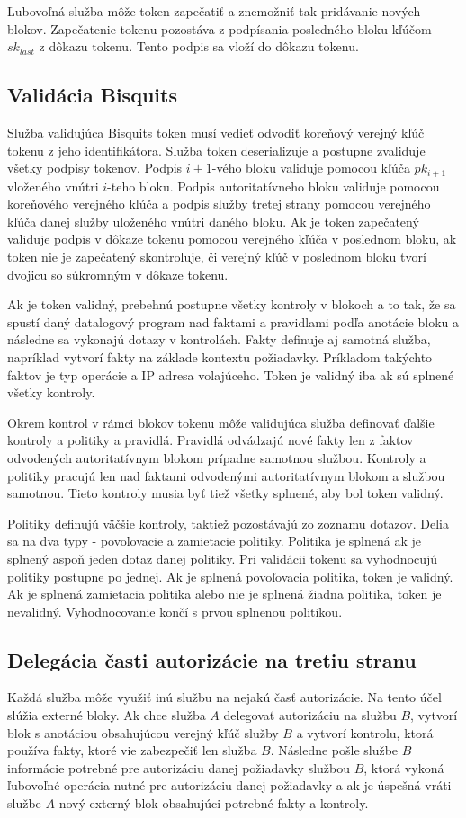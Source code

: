 Ľubovoľná služba môže token zapečatiť a znemožniť tak pridávanie nových blokov. Zapečatenie tokenu pozostáva z podpísania posledného bloku kľúčom $sk_{last}$ z dôkazu tokenu. Tento podpis sa vloží do dôkazu tokenu.

\subsection{Validácia Bisquits}

Služba validujúca Bisquits token musí vedieť odvodiť koreňový verejný kľúč tokenu z jeho identifikátora. Služba token deserializuje a postupne zvaliduje všetky podpisy tokenov. Podpis $i+1$-vého bloku validuje pomocou kľúča $pk_{i+1}$ vloženého vnútri $i$-teho bloku. Podpis autoritatívneho bloku validuje pomocou koreňového verejného kľúča a podpis služby tretej strany pomocou verejného kľúča danej služby uloženého vnútri daného bloku. Ak je token zapečatený validuje podpis v dôkaze tokenu pomocou verejného kľúča v poslednom bloku, ak token nie je zapečatený skontroluje, či verejný kľúč v poslednom bloku tvorí dvojicu so súkromným v dôkaze tokenu.

Ak je token validný, prebehnú postupne všetky kontroly v blokoch a to tak, že sa spustí daný datalogový program nad faktami a pravidlami podľa anotácie bloku a následne sa vykonajú dotazy v kontrolách. Fakty definuje aj samotná služba, napríklad vytvorí fakty na základe kontextu požiadavky. Príkladom takýchto faktov je typ operácie a IP adresa volajúceho. Token je validný iba ak sú splnené všetky kontroly. 

Okrem kontrol v rámci blokov tokenu môže validujúca služba definovať ďalšie kontroly a politiky a pravidlá. Pravidlá odvádzajú nové fakty len z faktov odvodených autoritatívnym blokom prípadne samotnou službou. Kontroly a politiky pracujú len nad faktami odvodenými autoritatívnym blokom a službou samotnou. Tieto kontroly musia byť tiež všetky splnené, aby bol token validný.

Politiky definujú väčšie kontroly, taktiež pozostávajú zo zoznamu dotazov. Delia sa na dva typy - povoľovacie a zamietacie politiky. Politika je splnená ak je splnený aspoň jeden dotaz danej politiky. Pri validácii tokenu sa vyhodnocujú politiky postupne po jednej. Ak je splnená povoľovacia politika, token je validný. Ak je splnená zamietacia politika alebo nie je splnená žiadna politika, token je nevalidný. Vyhodnocovanie končí s prvou splnenou politikou.

\subsection{Delegácia časti autorizácie na tretiu stranu}

Každá služba môže využiť inú službu na nejakú časť autorizácie. Na tento účel slúžia externé bloky. Ak chce služba $A$ delegovať autorizáciu na službu $B$, vytvorí blok s anotáciou obsahujúcou verejný kľúč služby $B$ a vytvorí kontrolu, ktorá používa fakty, ktoré vie zabezpečiť len služba $B$. Následne pošle službe $B$ informácie potrebné pre autorizáciu danej požiadavky službou $B$, ktorá vykoná ľubovoľné operácia nutné pre autorizáciu danej požiadavky a ak je úspešná vráti službe $A$ nový externý blok obsahujúci potrebné fakty a kontroly. 